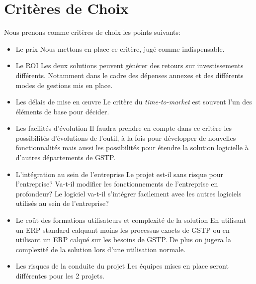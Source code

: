 \section{Critères de Choix}

Nous prenons comme critères de choix les points suivants: 

\begin{itemize}
    \item  Le prix\el
	Nous mettons en place ce critère, jugé comme indispensable.

    \item Le ROI\el
	Les deux solutions peuvent générer des retours sur investissements
différents. Notamment dans le cadre des dépenses annexes et des différents
modes de gestions mis en place.

    \item Les délais de mise en \oe{}uvre\el
	Le critère du {\sl time-to-market} est souvent l'un des éléments de
base pour décider.

    \item Les facilités d'évolution\el
	Il faudra prendre en compte dans ce critère les possibilités d'évolutions 
de l'outil, à la fois pour développer de nouvelles fonctionnalités mais aussi 
les possibilités pour étendre la solution logicielle à d'autres départements de
GSTP.

    \item L'intégration au sein de l'entreprise\el
	Le projet est-il sans risque pour l'entreprise? Va-t-il modifier les
fonctionnements de l'entreprise en profondeur? Le logiciel va-t-il s'intégrer
facilement avec les autres logiciels utilisés au sein de l'entreprise?

    \item  Le coût des formations utilisateurs et complexité de la solution\el
	En utilisant un ERP standard calquant moins les processus exacts de GSTP ou 
en utilisant un ERP calqué sur les besoins de GSTP. De plus on jugera la
complexité de la solution lors d'une utilisation normale.

    \item Les risques de la conduite du projet\el
	Les équipes mises en place seront différentes pour les 2 projets.

\end{itemize}


	
